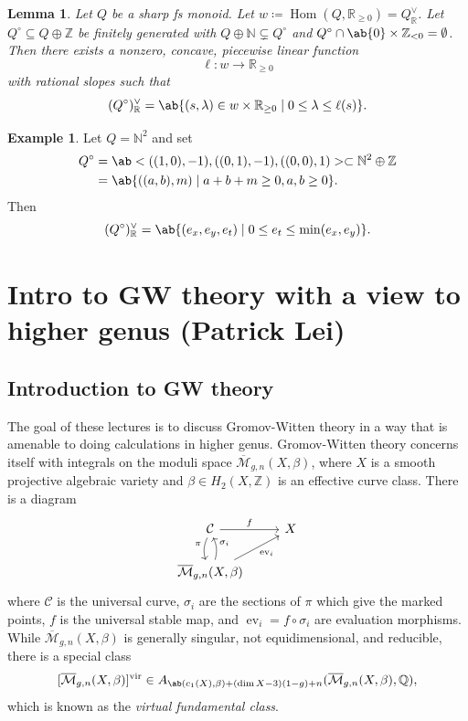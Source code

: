 \documentclass{amsart}
\newtheorem{lem}[thm]{Lemma}
\theoremstyle{definition}
\newtheorem{exm}[thm]{Example}
\theoremstyle{remark}
\theoremstyle{plain}
\theoremstyle{definition}
\theoremstyle{remark}
\newcommand{\N}{\mathbb{N}}
\newcommand{\R}{\mathbb{R}}
\newcommand{\Z}{\mathbb{Z}}
\newcommand{\Q}{\mathbb{Q}}
\newcommand{\Mbar}{\overline{\mathcal{M}}}
\newcommand{\mc}[1]{\mathcal{#1}}
\newcommand{\mr}[1]{\mathrm{#1}}
\newcommand{\on}[1]{\operatorname{#1}}
\newcommand{\1}{\mathbf{1}}
\newcommand{\2}{\mathbf{2}}
\newcommand{\3}{\mathbf{3}}
\newcommand{\vir}{\mr{vir}}
\DeclareMathOperator{\Hom}{Hom}
\DeclareMathOperator{\ev}{ev}
\begin{document}
\begin{lem}
    Let \(Q\) be a sharp fs monoid. Let \(w \coloneqq \Hom(Q, \R_{\geq 0}) = Q_{\R}^{\vee}\). Let \(Q^{\circ} \subseteq Q \oplus \Z\) be finitely generated with \(Q \oplus \N \subsetneq Q^{\circ}\) and \(Q^{\circ} \cap \ab\{0\} \times \Z_{<0} = \emptyset\). Then there exists a nonzero, concave, piecewise linear function
    \[ \ell \colon w \to \R_{\geq 0} \]
    with rational slopes such that
    \[ (Q^{\circ})_{\R}^{\vee} = \ab\{ (s, \lambda) \in w \times \R_{\geq 0} \mid 0 \leq \lambda \leq \ell(s) \}. \]
\end{lem}

\begin{exm}
    Let \(Q = \N^2\) and set 
    \begin{align*}
        Q^{\circ} &= \ab<((1,0), -1), ((0,1), -1), ((0,0),1)> \subset \N^2 \oplus \Z \\
        &= \ab\{((a,b), m) \mid a+b+m \geq 0, a,b \geq 0 \}.
    \end{align*}
    Then
    \[ (Q^{\circ})_{\R}^{\vee} = \ab\{ (e_x, e_y, e_t) \mid 0 \leq e_t \leq \min(e_x, e_y) \}. \]
\end{exm}





\section{Intro to GW theory with a view to higher genus (Patrick Lei)}%
\label{sec:Intro to GW theory with a view to higher genus (Patrick Lei)}


\subsection{Introduction to GW theory}%
\label{sub:Introduction to GW theory}

The goal of these lectures is to discuss Gromov-Witten theory in a way that is amenable to doing calculations in higher genus. Gromov-Witten theory concerns itself with integrals on the moduli space \(\Mbar_{g,n}(X, \beta)\), where \(X\) is a smooth projective algebraic variety and \(\beta \in H_2(X, \Z)\) is an effective curve class. There is a diagram
\begin{equation*}
\begin{tikzcd}
    \mc{C} \ar{r}{f} \ar[bend right=20]{d}[swap]{\pi} & X \\
    \Mbar_{g,n}(X, \beta) \ar[bend right=20]{u}[swap]{\sigma_i} \ar{ur}[swap]{\on{ev}_i}
\end{tikzcd}
\end{equation*}
where \(\mc{C}\) is the universal curve, \(\sigma_i\) are the sections of \(\pi\) which give the marked points, \(f\) is the universal stable map, and \(\ev_i = f \circ \sigma_i\) are evaluation morphisms. While \(\Mbar_{g,n}(X, \beta)\) is generally singular, not equidimensional, and reducible, there is a special class
\[ [\Mbar_{g,n}(X, \beta)]^{\vir} \in A_{\ab(c_1(X), \beta) + (\dim X - 3)(1-g) + n}(\Mbar_{g,n}(X, \beta), \Q), \]
which is known as the \textit{virtual fundamental class}. 
\end{document}
